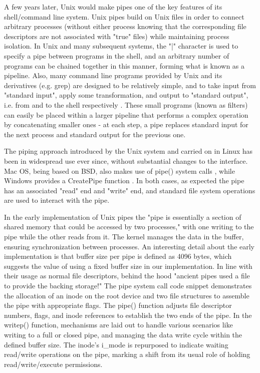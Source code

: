 A few years later, Unix would make pipes one of the key features of its shell/command line system. Unix pipes build on Unix files in order to connect arbitrary processes (without either process knowing that the corresponding file descriptors are not associated with "true" files) while maintaining process isolation. In Unix and many subsequent systems, the "|" character is used to specify a pipe between programs in the shell, and an arbitrary number of programs can be chained together in this manner, forming what is known as a pipeline. Also, many command line programs provided by Unix and its derivatives (e.g. grep) are designed to be relatively simple, and to take input from "standard input", apply some transformation, and output to "standard output", i.e. from and to the shell respectively \cite{unix2}.  These small programs (known as filters) can easily be placed within a larger pipeline that performs a complex operation by concatenating smaller ones - at each step, a pipe replaces standard input for the next process and standard output for the previous one.  

The piping approach introduced by the Unix system and carried on in Linux has been in widespread use ever since, without substantial changes to the interface. Mac OS, being based on BSD, also makes use of pipe() system calls \cite{macos}, while Windows provides a CreatePipe function \cite{windows}.  In both cases, as expected the pipe has an associated "read" end and "write" end, and standard file system operations are used to interact with the pipe.

In the early implementation of Unix pipes the "pipe is essentially a section of shared memory that could be accessed by two processes,"\cite{menonSen} with one writing to the pipe while the other reads from it. The kernel manages the data in the buffer, ensuring synchronization between processes. An interesting detail about the early implementation is that buffer size per pipe is defined as 4096 bytes, which suggests the value of using a fixed buffer size in our implementation. In line with their usage as normal file descriptors, behind the hood "ancient pipes used a file to provide the backing storage!"\cite{menonSen} The pipe system call code snippet demonstrates the allocation of an inode on the root device and two file structures to assemble the pipe with appropriate flags. The pipe() function adjusts file descriptor numbers, flags, and inode references to establish the two ends of the pipe. In the writep() function, mechanisms are laid out to handle various scenarios like writing to a full or closed pipe, and managing the data write cycle within the defined buffer size. The inode's i\_mode is repurposed to indicate waiting read/write operations on the pipe, marking a shift from its usual role of holding read/write/execute permissions.\cite{menonSen}

